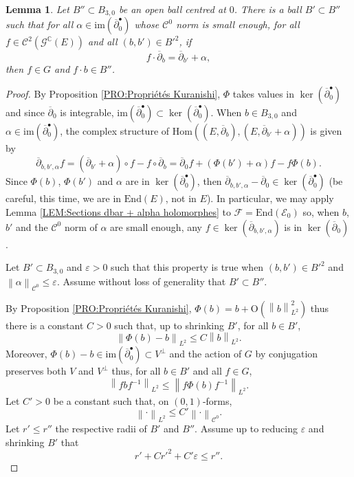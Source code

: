\documentclass{article}
\newtheorem{lemma}[theorem]{Lemma}
\theoremstyle{remark}
\theoremstyle{definition}
\newcommand{\C}{\mathbb{C}}
\newcommand{\im}{\mathrm{im}}
\newcommand{\Hom}{\mathrm{Hom}}
\newcommand{\End}{\mathrm{End}}
\newcommand{\norme}[1]{\left\| #1 \right\|}
\newcommand{\E}{\mathcal{E}}
\newcommand{\F}{\mathcal{F}}
\newcommand{\G}{\mathcal{G}}
\newcommand{\mC}{\mathcal{C}}
\newcommand{\dbar}{\overline{\partial}}
\renewcommand{\leq}{\leqslant}
\begin{document}
\begin{lemma}\label{LEM:Constuction B' subset B''}
    Let $B'' \subset B_{3,0}$ be an open ball centred at $0$. There is a ball $B' \subset B''$ such that for all $\alpha \in \im(\dbar_0^\bullet)$ whose $\mC^0$ norm is small enough, for all $f \in \mC^2(\G^\C(E))$ and all $(b,b') \in {B'}^2$, if
    $$
    f \cdot \dbar_b = \dbar_{b'} + \alpha,
    $$
    then $f \in G$ and $f \cdot b \in B''$.
\end{lemma}
\begin{proof}
By Proposition \ref{PRO:Propriétés Kuranishi}, $\Phi$ takes values in $\ker(\dbar_0^\bullet)$ and since $\dbar_0$ is integrable, $\im(\dbar_0^\bullet) \subset \ker(\dbar_0^\bullet)$. When $b \in B_{3,0}$ and $\alpha \in \im(\dbar_0^\bullet)$, the complex structure of $\Hom((E,\dbar_b),(E,\dbar_{b'} + \alpha))$ is given by
$$
\dbar_{b,b',\alpha}f = (\dbar_{b'} + \alpha) \circ f - f \circ \dbar_b = \dbar_0f + (\Phi(b') + \alpha)f - f\Phi(b).
$$
Since $\Phi(b)$, $\Phi(b')$ and $\alpha$ are in $\ker(\dbar_0^\bullet)$, then $\dbar_{b,b',\alpha} - \dbar_0 \in \ker(\dbar_0^\bullet)$ (be careful, this time, we are in $\End(E)$, not in $E$). In particular, we may apply Lemma \ref{LEM:Sections dbar + alpha holomorphes} to $\F = \End(\E_0)$ so, when $b$, $b'$ and the $\mC^0$ norm of $\alpha$ are small enough, any $f \in \ker(\dbar_{b,b',\alpha})$ is in $\ker(\dbar_0)$.

Let $B' \subset B_{3,0}$ and $\varepsilon > 0$ such that this property is true when $(b,b') \in {B'}^2$ and $\norme{\alpha}_{\mC^0} \leq \varepsilon$. Assume without loss of generality that $B' \subset B''$.

By Proposition \ref{PRO:Propriétés Kuranishi}, $\Phi(b) = b + \mathrm{O}(\norme{b}_{L^2}^2)$ thus there is a constant $C > 0$ such that, up to shrinking $B'$, for all $b \in B'$,
\begin{equation}\label{EQ:Inégalité norme Phi(b) - b}
    \norme{\Phi(b) - b}_{L^2} \leq C\norme{b}_{L^2}.
\end{equation}
Moreover, $\Phi(b) - b \in \im(\dbar_0^\bullet) \subset V^\bot$ and the action of $G$ by conjugation preserves both $V$ and $V^\bot$ thus, for all $b \in B'$ and all $f \in G$,
\begin{equation}\label{EQ:Inégalité norme fPhi(b)f-1}
    \norme{fbf^{-1}}_{L^2} \leq \norme{f\Phi(b)f^{-1}}_{L^2}.
\end{equation}
Let $C' > 0$ be a constant such that, on $(0,1)$-forms,
\begin{equation}\label{EQ:Norme L2 dominée}
    \norme{\cdot}_{L^2} \leq C'\norme{\cdot}_{\mC^0}.
\end{equation}
Let $r' \leq r''$ the respective radii of $B'$ and $B''$. Assume up to reducing $\varepsilon$ and shrinking $B'$ that
\begin{equation}\label{EQ:Inégalité rayons}
    r' + C{r'}^2 + C'\varepsilon \leq r''.
\end{equation}


\end{proof}
\end{document}

